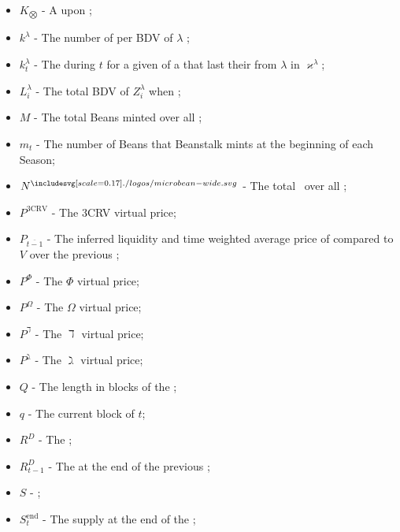\documentclass[class=article, crop=false]{standalone}
\begin{document}
\begin{itemize}[topsep=0pt, itemsep=3pt,leftmargin=16pt]
    \item[] $K_{\bigotimes}$ - \hypertarget{ht117}{A   upon };
    \item[] $k^{\lambda}$ - \hypertarget{ht120}{The number of  per BDV of $\lambda$ };
    \item[] $k_{t}^{\lambda}$ - \hypertarget{ht121}{The  during $t$ for a given  of a  that last  their  from \hyperlink{ht126}{$\lambda$}  in $\varkappa^{\lambda}$};
    \item[] $L_i^{\lambda}$ - \hypertarget{ht123}{The total BDV of $Z_i^{\lambda}$ when };
    \item[] $M$ - \hypertarget{ht128}{The total Beans minted over all };
    \item[] $m_t$ - The number of Beans that Beanstalk mints at the beginning of each Season;
    \item[] $N^{\bean}$ - \hypertarget{ht132}{The total  \Bean\ over all };
    \item[] $P^{\text{3CRV}}$ - \hypertarget{ht136}{The 3CRV virtual price};
    \item[] $P_{\overline{t-1}}$ - \hypertarget{ht139}{The inferred liquidity and time weighted average price of  compared to $V$ over the previous };
    \item[] $P^{\Phi}$ - \hypertarget{ht140}{The $\Phi$ virtual price};
    \item[] $P^{\Omega}$ - \hypertarget{ht141}{The $\Omega$ virtual price};
    \item[] $P^{\daleth}$ - \hypertarget{ht137}{The $\daleth$ virtual price};
    \item[] $P^{\gimel}$ - \hypertarget{ht138}{The $\gimel$ virtual price};
    \item[] $Q$ - The length in blocks of the ;
    \item[] $q$ - The current block of $t$;
    \item[] $R^D$ - \hypertarget{ht156}{The };
    \item[] $R^D_{t-1}$ - \hypertarget{ht157}{The  at the end of the previous };
    \item[] $S$ - \hypertarget{ht170}{};
    \item[] $S_t^{\text{end}}$ - \hypertarget{ht171}{The  supply at the end of the };

\end{itemize}
\end{document}
